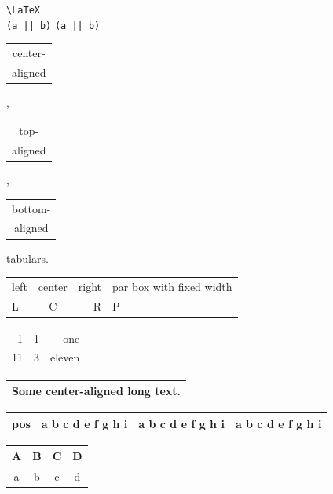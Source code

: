 \documentclass[UTF8]{ctexart}
\begin{document}

	\verb|\LaTeX| \\
	\verb+(a || b)+ \verb*+(a || b)+


	\begin{tabular}{|c|}
		center-\\ aligned \\
	\end{tabular},

	\begin{tabular}[t]{|c|}
		top-\\ aligned \\
	\end{tabular},

	\begin{tabular}[b]{|c|}
		bottom-\\ aligned\\
	\end{tabular} tabulars.


	\begin{tabular}{lcr|p{6em}}
		\hline
		left & center & right
		& par box with fixed width \\
		L
		& C
		& R
		& P \\
		\hline
	\end{tabular}

	\begin{tabular}{@{} r@{:}lr @{}}
		\hline
		1 & 1 & one    \\
		11 & 3 & eleven \\
		\hline
	\end{tabular}


	\begin{tabular}%
	{>{\centering\arraybackslash}p{9em}}
		\hline
		Some center-aligned long text. \\
		\hline
	\end{tabular}

	\newcommand\txt{a b c d e f g h i}
	\begin{tabular}{cp{2em}m{2em}b{2em}}
		\hline
		pos & \txt & \txt & \txt \\
		\hline
	\end{tabular}

	\begin{tabular*}{14em}%
	{@{\extracolsep{\fill}}|c|c|c|c|}
		\hline
		A & B & C & D \\ \hline
		a  & b & c & d \\ \hline
	\end{tabular*}
\end{document}
